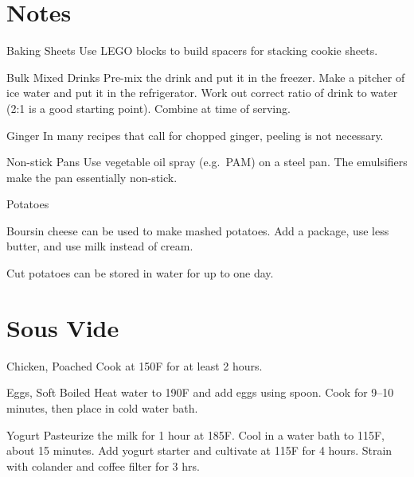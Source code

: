 \documentclass[oneside]{book}  %
\def\thisrecipe{}  %
\newcommand{\chapterrec}[1]{  %
  \newpage \def\thisrecipe{} \chapter{#1} \vspace{1.1em}
}
\newcommand{\degF}{\textdegree F\xspace}
\begin{document}
\frontmatter {} \tableofcontents

\mainmatter

\chapterrec{Notes} \label{chap:notes} %
\begin{kitchennotes}[font=\MakeUppercase]
  \item[Baking Sheets]
    Use LEGO blocks to build spacers for stacking cookie sheets.

  \item[Bulk Mixed Drinks]
    Pre-mix the drink and put it in the freezer. Make a pitcher of ice water and
    put it in the refrigerator. Work out correct ratio of drink to water (2:1 is
    a good starting point). Combine at time of serving.

  \item[Ginger]
    In many recipes that call for chopped ginger, peeling is not necessary.

  \item[Non-stick Pans]
    Use vegetable oil spray (e.g.\ PAM) on a steel pan. The emulsifiers make the
    pan essentially non-stick.

  \item[Potatoes] \begin{kitchensubnotes}
    \item Boursin cheese can be used to make mashed potatoes. Add a package, use
      less butter, and use milk instead of cream.
    \item Cut potatoes can be stored in water for up to one day.
  \end{kitchensubnotes}
\end{kitchennotes}

\chapterrec{Sous Vide} \label{chap:sous_vide} %
\begin{kitchennotes}
  \item[Chicken, Poached]
      
    Cook at 150\degF for at least 2 hours.

  \item[Eggs, Soft Boiled]
      
    Heat water to 190\degF and add eggs using spoon. Cook for 9--10 minutes,
    then place in cold water bath.

  \item[Yogurt]
     
    Pasteurize the milk for 1 hour at 185\degF. Cool in a water bath to
    115\degF, about 15 minutes. Add yogurt starter and cultivate at 115\degF
    for 4 hours. Strain with colander and coffee filter for 3 hrs.
\end{kitchennotes}
\end{document}
